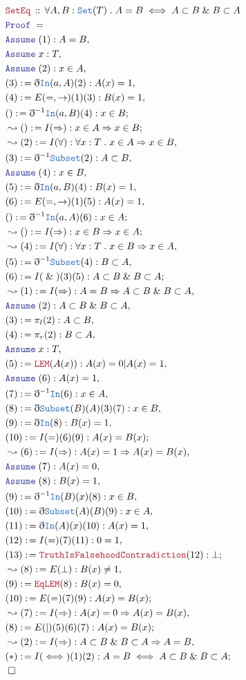 \documentclass[12pt]{scrartcl}
\newcommand{\TYPE}[1]{\textcolor{NavyBlue}{\mathtt{#1}}}
\newcommand{\LOGIC}[1]{\textcolor{Blue}{\mathtt{#1}}}
\newcommand{\THM}[1]{\textcolor{Maroon}{\mathtt{#1}}}
\renewcommand{\.}{\; . \;}
\newcommand{\de}{: \kern 0.1pc =}
\newcommand{\Theorem}[2]{& \THM{#1} \, :: \, #2 \\ & \Proof = \\ }
\newcommand{\Page}[1]{ \begin{align*} #1 \end{align*}   }
\newcommand{ \bd }{ \ByDef }
\renewcommand{\And}{\; \& \;}
\newcommand{\Set}{\TYPE{Set}}
\newcommand{\Say}[3]{& #1 \de #2 : #3, \\}
\newcommand{\Conclude}[3]{& #1 \de #2 : #3; \\}
\newcommand{\Derive}[3]{& \leadsto #1 \de #2 : #3, \\}
\newcommand{\DeriveConclude}[3]{& \leadsto #1 \de #2 : #3 ; \\}
\newcommand{\A}{\LOGIC{Assume} \;}
\newcommand{\Assume}[2]{& \A #1 : #2, \\}
\newcommand{\QED}{\; \square}
\newcommand{\EndProof}{& \QED \\}
\newcommand{\ByDef}{\eth}
\newcommand{\Proof}{\LOGIC{Proof} \; }
\begin{document}
\Page{
	\Theorem{SetEq}{\forall A,B : \Set(T) \. A = B \iff A \subset B \And B \subset A}
	\Assume{(1)}{A = B}
	\Assume{x}{T}
	\Assume{(2)}{x \in A}
	\Say{(3)}{\bd \TYPE{In}(a,A)(2)}{A(x) = 1}
	\Say{(4)}{ E(=,\to)(1)(3)  }{B(x) = 1}
	\Conclude{()}{\bd^{-1}\TYPE{In}(a,B)(4)}{x \in B}
	\DeriveConclude{()}{I(\Rightarrow)}{x \in A \Rightarrow x \in B}
	\Derive{(2)}{I(\forall)}{\forall x : T \. x \in A \Rightarrow x \in B}
	\Say{(3)}{\bd^{-1} \TYPE{Subset}(2)}{ A \subset B }
	\Assume{(4)}{x \in B}
	\Say{(5)}{\bd \TYPE{In}(a,B)(4)}{B(x) = 1}
	\Say{(6)}{ E(=,\to)(1)(5)  }{A(x) = 1}
	\Conclude{()}{\bd^{-1}\TYPE{In}(a,A)(6)}{x \in A}
	\DeriveConclude{()}{I(\Rightarrow)}{x \in B \Rightarrow x \in A}
	\Derive{(4)}{I(\forall)}{\forall x : T \. x \in B \Rightarrow x \in A}
	\Say{(5)}{\bd^{-1} \TYPE{Subset}(4)}{ B \subset A }
	\Conclude{(6)}{I(\And)(3)(5)}{ A \subset B \And B \subset A  }
	\Derive{(1)}{I(\Rightarrow)}{A = B \Rightarrow A \subset B \And B \subset A}
	\Assume{(2)}{A \subset B \And B \subset A}
	\Say{(3)}{\pi_l(2)}{A \subset B}
	\Say{(4)}{\pi_r(2)}{B \subset A}
	\Assume{x}{T}
	\Say{(5)}{\THM{LEM}(A(x))}{A(x) = 0 | A(x) = 1}
	\Assume{(6)}{A(x) = 1}
	\Say{(7)}{\bd^{-1} \TYPE{In}(6)}{x \in A}
	\Say{(8)}{\bd \TYPE{Subset}(B)(A)(3)(7)}{x \in B}
	\Say{(9)}{\bd \TYPE{In}(8)}{B(x) = 1}
	\Conclude{(10)}{I(=)(6)(9)}{A(x) = B(x)}
	\Derive{(6)}{I(\Rightarrow)}{A(x) = 1 \Rightarrow A(x) = B(x)}
	\Assume{(7)}{A(x) = 0}
	\Assume{(8)}{ B(x) = 1   }
	\Say{(9)}{\bd^{-1} \TYPE{In}(B)(x)(8) }{x \in B}
	\Say{(10)}{\bd \TYPE{Subset}(A)(B)(9)}{x \in A}
	\Say{(11)}{\bd \TYPE{In}(A)(x)(10)}{A(x) = 1}
	\Say{(12)}{I(=)(7)(11)}{0 = 1}
	\Conclude{(13)}{\THM{TruthIsFalsehoodContradiction}(12)}{\bot}
	\Derive{(8)}{E(\bot)}{B(x) \neq 1}
	\Say{(9)}{\THM{EqLEM}(8)}{ B(x) = 0}
	\Conclude{(10)}{E(=)(7)(9)}{A(x) = B(x)}
	\Derive{(7)}{I(\Rightarrow)}{ A(x) = 0 \Rightarrow A(x) = B(x)}
	\Conclude{(8)}{E(|)(5)(6)(7)}{A(x) = B(x)}
	\Derive{(2)}{I(\Rightarrow)}{A \subset B \And B \subset A \Rightarrow A = B}
	\Conclude{(*)}{I(\iff)(1)(2)}{A = B \iff A \subset B \And B \subset A}
	\EndProof
}
\end{document}
